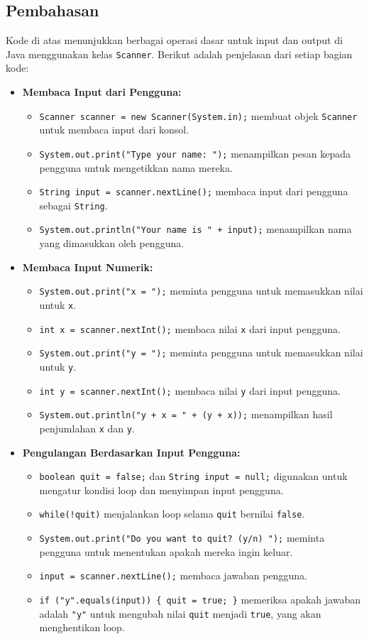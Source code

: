 \subsection{Pembahasan}
Kode di atas menunjukkan berbagai operasi dasar untuk input dan output di Java menggunakan kelas \texttt{Scanner}. Berikut adalah penjelasan dari setiap bagian kode:

\begin{itemize}
	\item \textbf{Membaca Input dari Pengguna:}
	\begin{itemize}
		\item \texttt{Scanner scanner = new Scanner(System.in);} membuat objek \texttt{Scanner} untuk membaca input dari konsol.
		\item \texttt{System.out.print("Type your name: ");} menampilkan pesan kepada pengguna untuk mengetikkan nama mereka.
		\item \texttt{String input = scanner.nextLine();} membaca input dari pengguna sebagai \texttt{String}.
		\item \texttt{System.out.println("Your name is " + input);} menampilkan nama yang dimasukkan oleh pengguna.
	\end{itemize}
	
	\item \textbf{Membaca Input Numerik:}
	\begin{itemize}
		\item \texttt{System.out.print("x = ");} meminta pengguna untuk memasukkan nilai untuk \texttt{x}.
		\item \texttt{int x = scanner.nextInt();} membaca nilai \texttt{x} dari input pengguna.
		\item \texttt{System.out.print("y = ");} meminta pengguna untuk memasukkan nilai untuk \texttt{y}.
		\item \texttt{int y = scanner.nextInt();} membaca nilai \texttt{y} dari input pengguna.
		\item \texttt{System.out.println("y + x = " + (y + x));} menampilkan hasil penjumlahan \texttt{x} dan \texttt{y}.
	\end{itemize}
	
	\item \textbf{Pengulangan Berdasarkan Input Pengguna:}
	\begin{itemize}
		\item \texttt{boolean quit = false;} dan \texttt{String input = null;} digunakan untuk mengatur kondisi loop dan menyimpan input pengguna.
		\item \texttt{while(!quit)} menjalankan loop selama \texttt{quit} bernilai \texttt{false}.
		\item \texttt{System.out.print("Do you want to quit? (y/n) ");} meminta pengguna untuk menentukan apakah mereka ingin keluar.
		\item \texttt{input = scanner.nextLine();} membaca jawaban pengguna.
		\item \texttt{if ("y".equals(input)) \{ quit = true; \}} memeriksa apakah jawaban adalah \texttt{"y"} untuk mengubah nilai \texttt{quit} menjadi \texttt{true}, yang akan menghentikan loop.
	\end{itemize}
	

\end{itemize}
